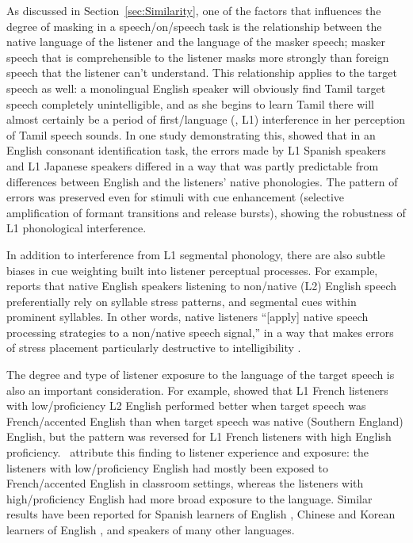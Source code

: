 
As discussed in Section~\ref{sec:Similarity}, one of the factors that influences the degree of masking in a speech\-/on\-/speech task is the relationship between the native language of the listener and the language of the masker speech; masker speech that is comprehensible to the listener masks more strongly than foreign speech that the listener can’t understand.  This relationship applies to the target speech as well: a monolingual English speaker will obviously find Tamil target speech completely unintelligible, and as she begins to learn Tamil there will almost certainly be a period of first\-/language (\aka, L1) interference in her perception of Tamil speech sounds.  In one study demonstrating this, \citet{HazanSimpson2000} showed that in an English consonant identification task, the errors made by L1 Spanish speakers and L1 Japanese speakers differed in a way that was partly predictable from differences between English and the listeners’ native phonologies.  The pattern of errors was preserved even for stimuli with cue enhancement (selective amplification of formant transitions and release bursts), showing the robustness of L1 phonological interference.

In addition to interference from L1 segmental phonology, there are also subtle biases in cue weighting built into listener perceptual processes.  For example, \citeauthor*{Zielinski2008} reports that native English speakers listening to non\-/native (L2) English speech preferentially rely on syllable stress patterns, and segmental cues within prominent syllables.  In other words, native listeners “[apply] native speech processing strategies to a non\-/native speech signal,” in a way that makes errors of stress placement particularly destructive to intelligibility \citep[80]{Zielinski2008}.

The degree and type of listener exposure to the language of the target speech is also an important consideration.  For example, \citet{PinetEtAl2011} showed that L1 French listeners with low\-/proficiency L2 English performed better when target speech was French\-/accented English than when target speech was native (Southern England) English, but the pattern was reversed for L1 French listeners with high English proficiency.  \citeauthor*{PinetEtAl2011}\ attribute this finding to listener experience and exposure: the listeners with low\-/proficiency English had mostly been exposed to French\-/accented English in classroom settings, whereas the listeners with high\-/proficiency English had more broad exposure to the language.  Similar results have been reported for Spanish learners of English \citep{ImaiEtAl2005}, Chinese and Korean learners of English \citep{BentBradlow2003}, and speakers of many other languages.%

